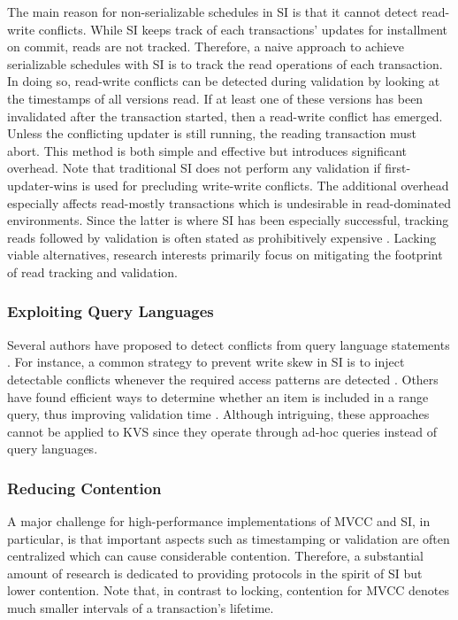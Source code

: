 The main reason for non-serializable schedules in SI is that it cannot detect
read-write conflicts. While SI keeps track of each transactions' updates for
installment on commit, reads are not tracked. Therefore, a naive approach to
achieve serializable schedules with SI is to track the read operations of each
transaction. In doing so, read-write conflicts can be detected during validation
by looking at the timestamps of all versions read. If at least one of these
versions has been invalidated after the transaction started, then a read-write
conflict has emerged. Unless the conflicting updater is still running, the
reading transaction must abort. This method is both simple and effective but
introduces significant overhead. Note that traditional SI does not perform any
validation if first-updater-wins is used for precluding write-write conflicts.
The additional overhead especially affects read-mostly transactions which is
undesirable in read-dominated environments. Since the latter is where SI has
been especially successful, tracking reads followed by validation is often
stated as prohibitively expensive \cite{cahill2009serializable}. Lacking viable
alternatives, research interests primarily focus on mitigating the footprint of
read tracking and validation.

\subsubsection{Exploiting Query Languages}

Several authors have proposed to detect conflicts from query language statements
\cite{fekete2005making, faleiro2015rethinking, neumann2015fast}. For instance, a
common strategy to prevent write skew in SI is to inject detectable conflicts
whenever the required access patterns are detected \cite{fekete2005making}.
Others have found efficient ways to determine whether an item is included in a
range query, thus improving validation time \cite{neumann2015fast}. Although
intriguing, these approaches cannot be applied to KVS since they operate through
ad-hoc queries instead of query languages.

\subsubsection{Reducing Contention}

A major challenge for high-performance implementations of MVCC and SI, in
particular, is that important aspects such as timestamping or validation are
often centralized which can cause considerable contention. Therefore, a
substantial amount of research is dedicated to providing protocols in the spirit
of SI but lower contention. Note that, in contrast to locking, contention for
MVCC denotes much smaller intervals of a transaction's lifetime.

